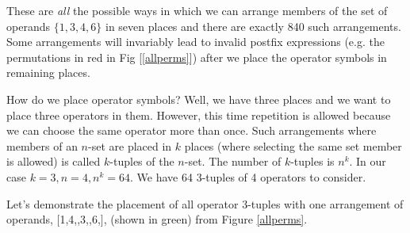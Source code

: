 \documentclass[english,smartquotes]{hgbarticle}
\begin{document}
These are \emph{all} the possible ways in which we can arrange members of the set of operands $\{1,3, 4, 6\}$ in seven places and there are exactly 840 such arrangements. Some arrangements will invariably lead to invalid postfix expressions (e.g. the permutations in red in Fig [\ref{allperms}]) after we place the operator symbols in remaining places. 

How do we place operator symbols? Well, we have three places and we want to place three operators in them. However, this time repetition is allowed because we can choose the same operator more than once. Such arrangements where members of an $n$-set are placed in $k$ places (where selecting the same set member is allowed) is called $k$-tuples \cite{ktuples} of the $n$-set. The number of $k$-tuples is $n^{k}$. In our case $k=3, n=4, n^k=64$. We have 64 3-tuples of 4 operators to consider.

Let's demonstrate the placement of all operator 3-tuples with one arrangement of operands, $[$1,4,\textvisiblespace,3,\textvisiblespace,6,\textvisiblespace$]$, (shown in green) from Figure \ref{allperms}.
\end{document}

